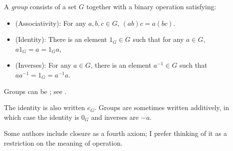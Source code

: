 


\begin{dfn*}
	A \emph{group} consists of a set $G$ together with a binary operation satisfying:
	\begin{itemize}
		\item (Associativity): For any $a,b,c\in G$, $(ab)c = a(bc)$.
		\item (Identity): There is an element $1_G\in G$ such that for any $a\in G$, $a1_G = a = 1_Ga$,
		\item (Inverses): For any $a\in G$, there is an element $a^{-1}\in G$ such that
		      $aa^{-1} = 1_G = a^{-1}a$.
	\end{itemize}
\end{dfn*}

Groups can be ; see .

\begin{notation}
	The identity is also written $e_G$. Groups are sometimes written additively,
	in which case the identity is $0_G$ and inverses are $-a$.

	Some authors include closure as a fourth axiom; I prefer thinking of it as a
	restriction on the meaning of operation.
\end{notation}

